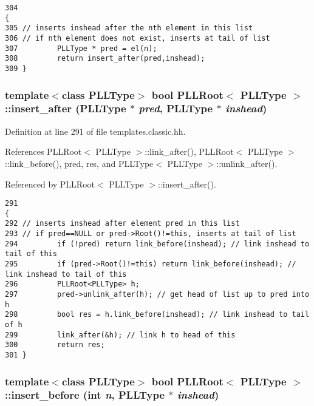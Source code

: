 \footnotesize\begin{verbatim}304                                                                    {
305 // inserts inshead after the nth element in this list
306 // if nth element does not exist, inserts at tail of list
307         PLLType * pred = el(n);
308         return insert_after(pred,inshead);
309 } 
\end{verbatim}\normalsize 
{}
\subsubsection{\setlength{\rightskip}{0pt plus 5cm}template$<$class PLLType$>$ bool PLLRoot$<$ {\bf PLLType} $>$::insert\_\-after ({\bf PLLType} $\ast$ {\em pred}, {\bf PLLType} $\ast$ {\em inshead})\hspace{0.3cm}{\tt  [inline]}}\label{classPLLRoot_a12}




Definition at line 291 of file templates.classic.hh.

References PLLRoot$<$ PLLType $>$::link\_\-after(), PLLRoot$<$ PLLType $>$::link\_\-before(), pred, res, and PLLType$<$ PLLType $>$::unlink\_\-after().

Referenced by PLLRoot$<$ PLLType $>$::insert\_\-after().



\footnotesize\begin{verbatim}291                                                                             {
292 // inserts inshead after element pred in this list
293 // if pred==NULL or pred->Root()!=this, inserts at tail of list
294         if (!pred) return link_before(inshead); // link inshead to tail of this
295         if (pred->Root()!=this) return link_before(inshead); // link inshead to tail of this
296         PLLRoot<PLLType> h;
297         pred->unlink_after(h); // get head of list up to pred into h
298         bool res = h.link_before(inshead); // link inshead to tail of h
299         link_after(&h); // link h to head of this
300         return res;
301 } 
\end{verbatim}\normalsize 
{}
\subsubsection{\setlength{\rightskip}{0pt plus 5cm}template$<$class PLLType$>$ bool PLLRoot$<$ {\bf PLLType} $>$::insert\_\-before (int {\em n}, {\bf PLLType} $\ast$ {\em inshead})\hspace{0.3cm}{\tt  [inline]}}\label{classPLLRoot_a66}


